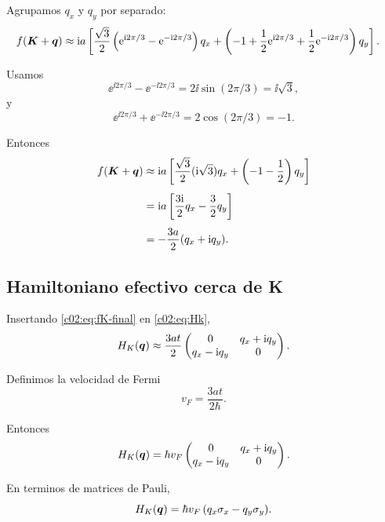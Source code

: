 Agrupamos \(q_x\) y \(q_y\) por separado:
\begin{align}
f(\bm{K}+\bm{q})
&\approx
\mathrm{i} a
\left[
\frac{\sqrt{3}}{2}\left(\mathrm{e}^{\mathrm{i} 2\pi/3}-\mathrm{e}^{-\mathrm{i} 2\pi/3}\right)q_x
+
\left(
-1+\frac{1}{2}\mathrm{e}^{\mathrm{i} 2\pi/3}+\frac{1}{2}\mathrm{e}^{-\mathrm{i} 2\pi/3}
\right)q_y
\right].
\end{align}

Usamos
\begin{equation}
\ee^{\ii 2\pi/3}-\ee^{-\ii 2\pi/3}=2\ii \sin(2\pi/3)=\ii\sqrt{3},
\end{equation}
y
\begin{equation}
\ee^{\ii 2\pi/3}+\ee^{-\ii 2\pi/3}=2\cos(2\pi/3)=-1.
\end{equation}

Entonces
\begin{align}
f(\bm{K}+\bm{q})
&\approx
\mathrm{i} a
\left[
\frac{\sqrt{3}}{2}(\mathrm{i}\sqrt{3})q_x
+\left(-1-\frac{1}{2}\right)q_y
\right]
\nonumber\\[4pt]
&=
\mathrm{i} a
\left[
\frac{3\mathrm{i}}{2}q_x - \frac{3}{2}q_y
\right]
\nonumber\\[4pt]
&=
-\frac{3a}{2}(q_x+\mathrm{i} q_y).
\label{c02:eq:fK-final}
\end{align}

\subsection{Hamiltoniano efectivo cerca de K}

Insertando \eqref{c02:eq:fK-final} en \eqref{c02:eq:Hk},
\begin{equation}
H_K(\bm{q})
\approx
\frac{3at}{2}
\begin{pmatrix}
0 & q_x+\mathrm{i} q_y\\
q_x-\mathrm{i} q_y & 0
\end{pmatrix}.
\end{equation}

Definimos la velocidad de Fermi
\begin{equation}
v_F=\frac{3at}{2\hbar}.
\label{c02:eq:vf}
\end{equation}

Entonces
\begin{equation}
H_K(\bm{q})
=
\hbar v_F
\begin{pmatrix}
0 & q_x+\mathrm{i} q_y\\
q_x-\mathrm{i} q_y & 0
\end{pmatrix}.
\label{c02:eq:HK-matrix}
\end{equation}

En terminos de matrices de Pauli,
\begin{equation}
H_K(\bm{q})=\hbar v_F\,(q_x \sigma_x - q_y \sigma_y).
\label{c02:eq:HK-pauli}
\end{equation}

